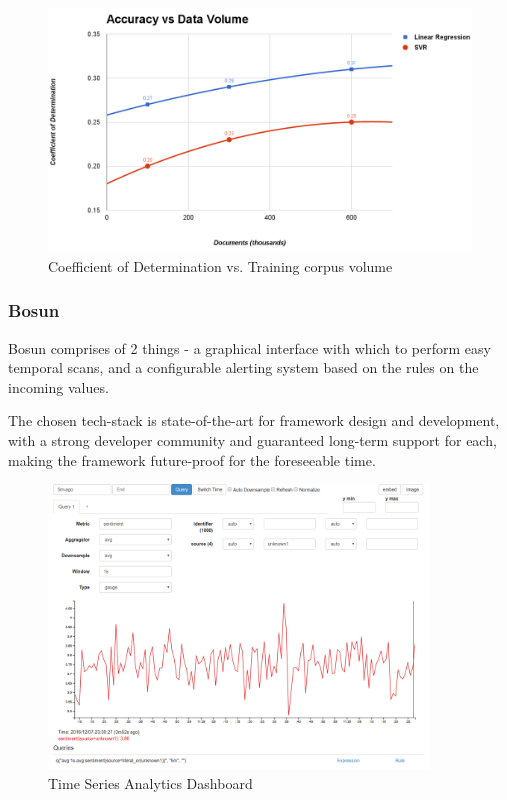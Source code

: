 \documentclass[conference]{IEEEtran}
\begin{document}
        \begin{figure}[ht]
            \centering
            \includegraphics[width=\textwidth]{images/accuracy-vs-data.png}
            \caption{Coefficient of Determination vs. Training corpus volume}
            \label{fig:accuracy-v-data}
        \end{figure}
        
        \subsubsection{Bosun}
            Bosun comprises of 2 things - a graphical interface with which to perform easy temporal scans, and a configurable alerting system based on the rules on the incoming values\cite{bosun_repo}. 

        The chosen tech-stack is state-of-the-art for framework design and development, with a strong developer community and guaranteed long-term support for each, making the framework future-proof for the foreseeable time.

\begin{figure}[ht]
    \centering
    \includegraphics[width=0.9\textwidth]{images/bosun_dash_1.png}
    \caption{Time Series Analytics Dashboard}
    \label{fig:time-series-analytics-dashboard}
\end{figure}
\end{document}
